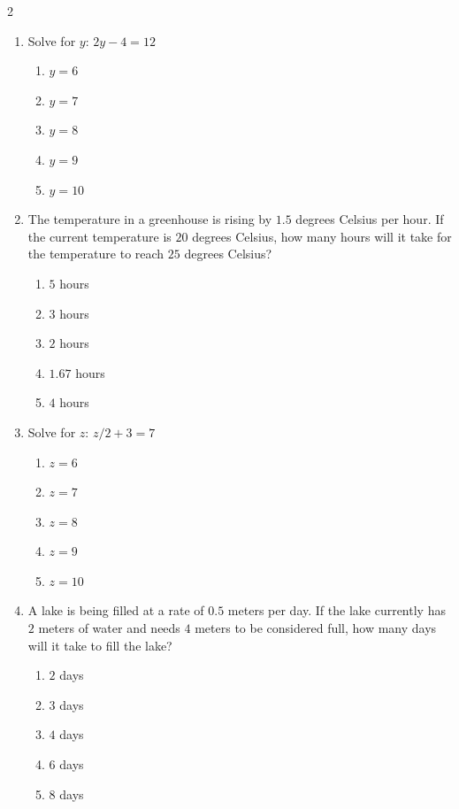 \documentclass[10pt]{article}
\begin{document}
\begin{multicols}{2}
\begin{enumerate}[label=\textbf{Q\arabic*.}, leftmargin=*, itemsep=6pt, parsep=0pt]
  \item \small Solve for $y$: $2y - 4 = 12$
  \begin{enumerate}[label=(\Alph*), leftmargin=0.6cm, nosep, itemsep=2pt]
    \item $y = 6$
    \item $y = 7$
    \item $y = 8$
    \item $y = 9$
    \item $y = 10$
  \end{enumerate}

  \item \small The temperature in a greenhouse is rising by $1.5$ degrees Celsius per hour. If the current temperature is $20$ degrees Celsius, how many hours will it take for the temperature to reach $25$ degrees Celsius?
  \begin{enumerate}[label=(\Alph*), leftmargin=0.6cm, nosep, itemsep=2pt]
    \item $5$ hours
    \item $3$ hours
    \item $2$ hours
    \item $1.67$ hours
    \item $4$ hours
  \end{enumerate}

  \item \small Solve for $z$: $z/2 + 3 = 7$
  \begin{enumerate}[label=(\Alph*), leftmargin=0.6cm, nosep, itemsep=2pt]
    \item $z = 6$
    \item $z = 7$
    \item $z = 8$
    \item $z = 9$
    \item $z = 10$
  \end{enumerate}

  \item \small A lake is being filled at a rate of $0.5$ meters per day. If the lake currently has $2$ meters of water and needs $4$ meters to be considered full, how many days will it take to fill the lake?
  \begin{enumerate}[label=(\Alph*), leftmargin=0.6cm, nosep, itemsep=2pt]
    \item $2$ days
    \item $3$ days
    \item $4$ days
    \item $6$ days
    \item $8$ days
  \end{enumerate}


\end{enumerate}
\end{multicols}
\end{document}
